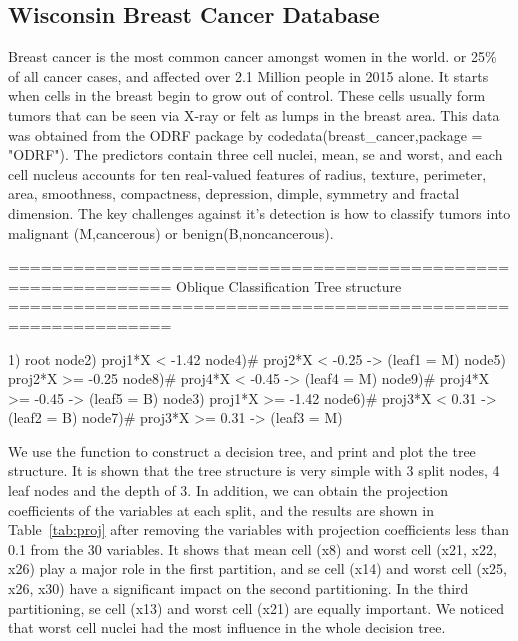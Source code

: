 \documentclass[nojss]{jss}
\newcommand{\fct}[1]{\code{#1()}}
\numberwithin{equation}{section}
\begin{document}
\subsection{Wisconsin Breast Cancer Database}
Breast cancer is the most common cancer amongst women in the world. or 25\% of all cancer cases, and affected over 2.1 Million people in 2015 alone. It starts when cells in the breast begin to grow out of control. These cells usually form tumors that can be seen via X-ray or felt as lumps in the breast area. This data was obtained from the ODRF package by code{data(breast\_cancer,package = "ODRF")}. The predictors contain three cell nuclei, mean, se and worst, and each cell nucleus accounts for ten real-valued features of radius, texture, perimeter, area, smoothness, compactness, depression, dimple, symmetry and fractal dimension. The key challenges against it's detection is how to classify tumors into malignant (M,cancerous) or benign(B,noncancerous).
\begin{Schunk}
\begin{Soutput}
============================================================= 
Oblique Classification Tree structure 
=============================================================

1) root
   node2)  proj1*X < -1.42
      node4)# proj2*X < -0.25 -> (leaf1 = M)
      node5)  proj2*X >= -0.25
         node8)# proj4*X < -0.45 -> (leaf4 = M)
         node9)# proj4*X >= -0.45 -> (leaf5 = B)
   node3)  proj1*X >= -1.42
      node6)# proj3*X < 0.31 -> (leaf2 = B)
      node7)# proj3*X >= 0.31 -> (leaf3 = M)
\end{Soutput}
\end{Schunk}
We use the function \fct{ODT} to construct a decision tree, and print and plot the tree structure. It is shown that the tree structure is very simple with 3 split nodes, 4 leaf nodes and the depth of 3. In addition, we can obtain the projection coefficients of the variables at each split, and the results are shown in Table~\ref{tab:proj} after removing the variables with projection coefficients less than 0.1 from the 30 variables. It shows that mean cell (x8) and worst cell (x21, x22, x26) play a major role in the first partition, and se cell (x14) and worst cell (x25, x26, x30) have a significant impact on the second partitioning. In the third partitioning, se cell (x13) and worst cell (x21) are equally important. We noticed that worst cell nuclei had the most influence in the whole decision tree.
\end{document}
